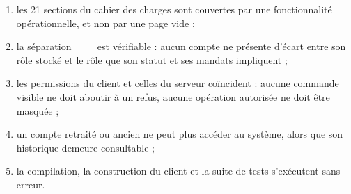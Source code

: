 \begin{enumerate}
  \item les 21 sections du cahier des charges sont couvertes par une fonctionnalité
        opérationnelle, et non par une page vide ;
  \item la séparation \srt{}~\neqq{}~\rol{}~\neqq{}~\man{} est vérifiable : aucun compte
        ne présente d'écart entre son rôle stocké et le rôle que son statut et ses mandats
        impliquent ;
  \item les permissions du client et celles du serveur coïncident : aucune commande
        visible ne doit aboutir à un refus, aucune opération autorisée ne doit être
        masquée ;
  \item un compte retraité ou ancien ne peut plus accéder au système, alors que son
        historique demeure consultable ;
  \item la compilation, la construction du client et la suite de tests s'exécutent sans
        erreur.
\end{enumerate}
